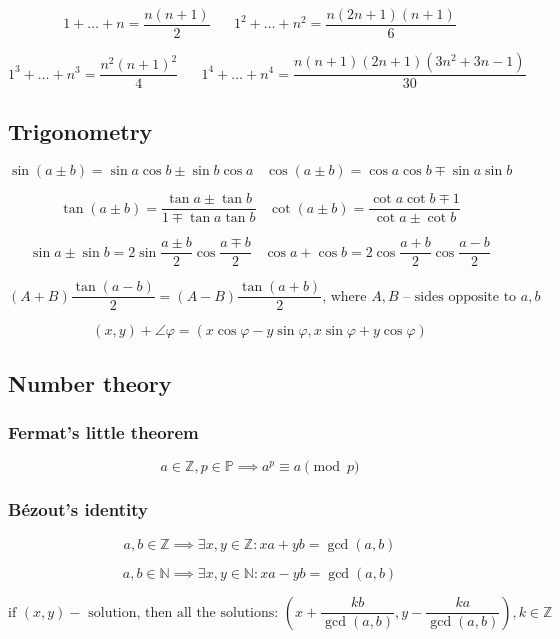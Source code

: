 $$
1 + \ldots + n = \frac{n(n+1)}{2}
\hspace{20pt}
1^2 + \ldots + n^2 = \frac{n(2n+1)(n+1)}{6}
$$

$$
1^3 + \ldots + n^3 = \frac{n^2(n+1)^2}{4}
\hspace{20pt}
1^4 + \ldots + n^4 = \frac{n(n+1)(2n+1)(3n^2+3n-1)}{30}
$$

\subsection{Trigonometry}

$$
\sin(a \pm b) = \sin a \cos b \pm \sin b \cos a
\;\;\;
\cos(a \pm b) = \cos a \cos b \mp \sin a \sin b
$$

$$
\tan(a \pm b) = \frac{\tan a \pm \tan b}{1 \mp \tan a \tan b}
\;\;\;
\cot(a \pm b) = \frac{\cot a \cot b \mp 1}{\cot a \pm \cot b}
$$

$$
\sin a \pm \sin b = 2 \sin\frac{a \pm b}{2} \cos\frac{a \mp b}{2}
\;\;\;
\cos a + \cos b = 2 \cos\frac{a + b}{2} \cos\frac{a - b}{2}
$$

$$
(A + B) \frac{\tan(a - b)}{2} = (A - B) \frac{\tan(a + b)}{2}
\text{, where } A, B \text{ -- sides opposite to } a, b
$$

$$
(x, y) + \angle\varphi = (x \cos\varphi - y \sin\varphi, x \sin\varphi + y \cos\varphi)
$$

\subsection{Number theory}

\subsubsection{Fermat's little theorem}

$$
a \in \mathbb{Z}, p \in \mathbb{P}
\implies
a^p \equiv a \pmod{p}
$$

\subsubsection{Bézout's identity}

$$
a, b \in \mathbb{Z}
\implies
\exists x, y \in \mathbb{Z}: xa + yb = \gcd{(a, b)}
$$

\vspace{-1em}
$$
a, b \in \mathbb{N}
\implies
\exists x, y \in \mathbb{N}: xa - yb = \gcd{(a, b)}
$$

\vspace{-1em}
$$
\text{if } (x, y) - \text{ solution, then all the solutions: }
\left(
  x + \frac{kb}{\gcd{(a, b)}}, y - \frac{ka}{\gcd{(a, b)}}
\right), k \in \mathbb{Z}
$$


